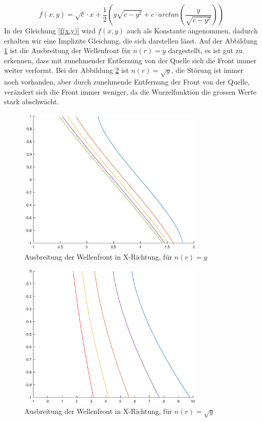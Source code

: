 \begin{refsection}
\begin{equation}\label{f(x,y)}
f(x,y)= \sqrt{c}\cdot x + \dfrac{1}{2}\left(y \sqrt{c-y^{2}}+c \cdot arctan\left(  \dfrac{y}{\sqrt{c-y^{2}}}\right) \right) 
\end{equation}
In der Gleichung \eqref{f(x,y)} wird $f(x,y)$ auch als Konstante angenommen, dadurch erhalten wir eine Implizite Gleichung, die sich darstellen lässt. 
Auf der Abbildung \ref{fig:plotwf1} ist die Ausbreitung der Wellenfront für $n(r)=y$ dargestellt, es ist gut zu erkennen, dass mit zunehmender Entfernung von der Quelle sich die Front immer weiter verformt. Bei der Abbildung \ref{fig:plotwf2} ist $n(r)= \sqrt{y}$, die Störung ist immer noch vorhanden, aber durch zunehmende Entfernung der Front von der Quelle, verändert sich die Front immer weniger, da die Wurzelfunktion die grossen Werte stark abschwächt.
\begin{figure}
  \centering
  \includegraphics[width=0.8\textwidth]{adaptiv/images/plotwf1}
  \caption{Ausbreitung der Wellenfront in X-Richtung, für $n(r)=y$}
  \label{fig:plotwf1}
\end{figure}

\begin{figure}
  \centering
  \includegraphics[width=0.8\textwidth]{adaptiv/images/plotwf2}
  \caption{Ausbreitung der Wellenfront in X-Richtung, für $n(r)=\sqrt{y}$}
  \label{fig:plotwf2}
\end{figure}

\printbibliography[heading=subbibliography]
\end{refsection}















